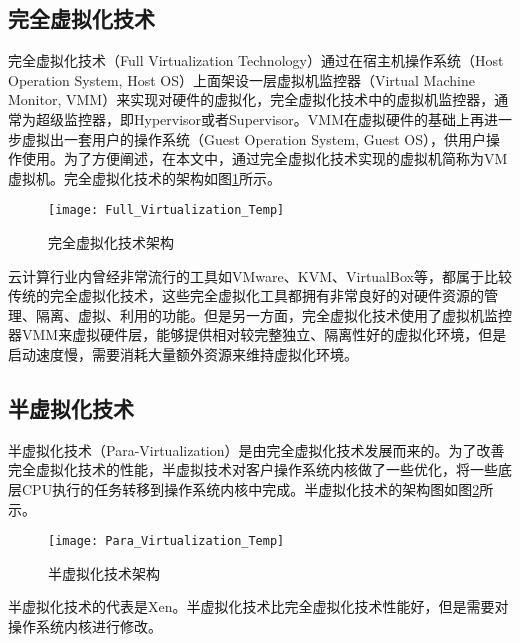 \subsection{完全虚拟化技术}

完全虚拟化技术（Full Virtualization Technology）通过在宿主机操作系统（Host Operation System, Host OS）上面架设一层虚拟机监控器（Virtual Machine Monitor, VMM）\citep{li2017performance}来实现对硬件的虚拟化，完全虚拟化技术中的虚拟机监控器，通常为超级监控器，即Hypervisor或者Supervisor\citep{kolhe2012comparative}\citep{leite2012performance}。VMM在虚拟硬件的基础上再进一步虚拟出一套用户的操作系统（Guest Operation System, Guest OS），供用户操作使用。为了方便阐述，在本文中，通过完全虚拟化技术实现的虚拟机简称为VM虚拟机。完全虚拟化技术的架构如图\ref{fig:full_virtualization}所示\citep{oludele2014evolution}。

\begin{figure}[!htbp]
    \centering
    \texttt{[image: Full\_Virtualization\_Temp]}
    \caption{完全虚拟化技术架构}
    \label{fig:full_virtualization}
\end{figure}

云计算行业内曾经非常流行的工具如VMware\citep{sahasrabudhe2014comparing,li2010selecting}、KVM\citep{liu2014research}、VirtualBox\citep{li2010selecting}等，都属于比较传统的完全虚拟化技术，这些完全虚拟化工具都拥有非常良好的对硬件资源的管理、隔离、虚拟、利用的功能。但是另一方面，完全虚拟化技术使用了虚拟机监控器VMM来虚拟硬件层，能够提供相对较完整独立、隔离性好的虚拟化环境，但是启动速度慢，需要消耗大量额外资源来维持虚拟化环境。

\subsection{半虚拟化技术}

半虚拟化技术（Para-Virtualization）是由完全虚拟化技术发展而来的。为了改善完全虚拟化技术的性能，半虚拟技术对客户操作系统内核做了一些优化，将一些底层CPU执行的任务转移到操作系统内核中完成。半虚拟化技术的架构图如图\ref{fig:para_virtualization}所示\cite{2008半虚拟化技术分析与研究}。

\begin{figure}[!htbp]
    \centering
    \texttt{[image: Para\_Virtualization\_Temp]}
    \caption{半虚拟化技术架构}
    \label{fig:para_virtualization}
\end{figure}

半虚拟化技术的代表是Xen\cite{barham2003xen}。半虚拟化技术比完全虚拟化技术性能好，但是需要对操作系统内核进行修改。

